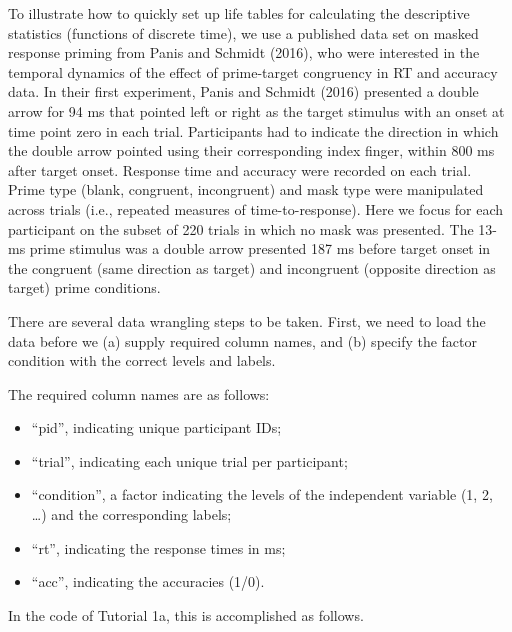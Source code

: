 \documentclass[
  english,
  man, donotrepeattitle,floatsintext]{apa6}
\providecommand{\tightlist}{%
  \setlength{\itemsep}{0pt}\setlength{\parskip}{0pt}}
\begin{document}
To illustrate how to quickly set up life tables for calculating the descriptive statistics (functions of discrete time), we use a published data set on masked response priming from Panis and Schmidt (2016), who were interested in the temporal dynamics of the effect of prime-target congruency in RT and accuracy data.
In their first experiment, Panis and Schmidt (2016) presented a double arrow for 94 ms that pointed left or right as the target stimulus with an onset at time point zero in each trial. Participants had to indicate the direction in which the double arrow pointed using their corresponding index finger, within 800 ms after target onset. Response time and accuracy were recorded on each trial. Prime type (blank, congruent, incongruent) and mask type were manipulated across trials (i.e., repeated measures of time-to-response). Here we focus for each participant on the subset of 220 trials in which no mask was presented. The 13-ms prime stimulus was a double arrow presented 187 ms before target onset in the congruent (same direction as target) and incongruent (opposite direction as target) prime conditions.

There are several data wrangling steps to be taken. First, we need to load the data before we (a) supply required column names, and (b) specify the factor condition with the correct levels and labels.

The required column names are as follows:

\begin{itemize}
\tightlist
\item
  ``pid'', indicating unique participant IDs;
\item
  ``trial'', indicating each unique trial per participant;
\item
  ``condition'', a factor indicating the levels of the independent variable (1, 2, \ldots) and the corresponding labels;
\item
  ``rt'', indicating the response times in ms;
\item
  ``acc'', indicating the accuracies (1/0).
\end{itemize}

In the code of Tutorial 1a, this is accomplished as follows.

\footnotesize
\end{document}
